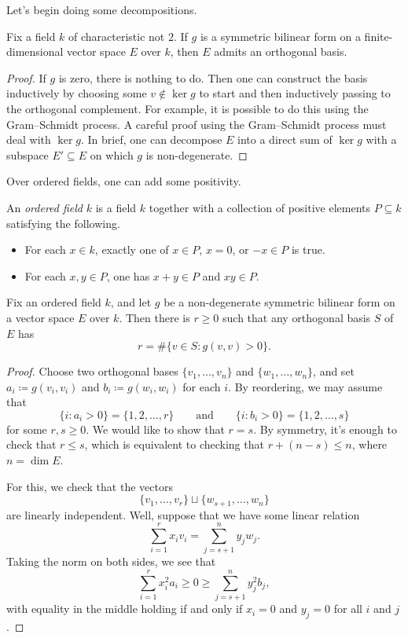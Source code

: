 \documentclass[../notes.tex]{subfiles}
\begin{document}
Let's begin doing some decompositions.
\begin{proposition}
	Fix a field $k$ of characteristic not $2$. If $g$ is a symmetric bilinear form on a finite-dimensional vector space $E$ over $k$, then $E$ admits an orthogonal basis.
\end{proposition}
\begin{proof}
	If $g$ is zero, there is nothing to do. Then one can construct the basis inductively by choosing some $v\notin\ker g$ to start and then inductively passing to the orthogonal complement. For example, it is possible to do this using the Gram--Schmidt process. A careful proof using the Gram--Schmidt process must deal with $\ker g$. In brief, one can decompose $E$ into a direct sum of $\ker g$ with a subspace $E'\subseteq E$ on which $g$ is non-degenerate.
\end{proof}
Over ordered fields, one can add some positivity.
\begin{definition}
	An \textit{ordered field} $k$ is a field $k$ together with a collection of positive elements $P\subseteq k$ satisfying the following.
	\begin{itemize}
		\item For each $x\in k$, exactly one of $x\in P$, $x=0$, or $-x\in P$ is true.
		\item For each $x,y\in P$, one has $x+y\in P$ and $xy\in P$.
	\end{itemize}
\end{definition}
\begin{theorem}[Sylvester] \label{thm:sylvester}
	Fix an ordered field $k$, and let $g$ be a non-degenerate symmetric bilinear form on a vector space $E$ over $k$. Then there is $r\ge0$ such that any orthogonal basis $S$ of $E$ has
	\[r=\#\{v\in S:g(v,v)>0\}.\]
\end{theorem}
\begin{proof}
	Choose two orthogonal bases $\{v_1,\ldots,v_n\}$ and $\{w_1,\ldots,w_n\}$, and set $a_i\coloneqq g(v_i,v_i)$ and $b_i\coloneqq g(w_i,w_i)$ for each $i$. By reordering, we may assume that
	\[\{i:a_i>0\}=\{1,2,\ldots,r\}\qquad\text{and}\qquad\{i:b_i>0\}=\{1,2,\ldots,s\}\]
	for some $r,s\ge0$. We would like to show that $r=s$. By symmetry, it's enough to check that $r\le s$, which is equivalent to checking that $r+(n-s)\le n$, where $n=\dim E$.
	
	For this, we check that the vectors
	\[\{v_1,\ldots,v_r\}\sqcup\{w_{s+1},\ldots,w_n\}\]
	are linearly independent. Well, suppose that we have some linear relation
	\[\sum_{i=1}^rx_iv_i=\sum_{j=s+1}^ny_jw_j.\]
	Taking the norm on both sides, we see that
	\[\sum_{i=1}^rx_i^2a_i\ge0\ge\sum_{j=s+1}^ny_j^2b_j,\]
	with equality in the middle holding if and only if $x_i=0$ and $y_j=0$ for all $i$ and $j$.
\end{proof}
\end{document}
